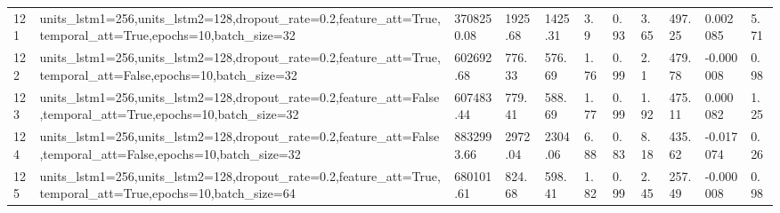\begin{longtable}{C{0.8cm} L{2cm} C{1.15cm} C{1.15cm} C{1.15cm} C{1.15cm} C{0.85cm} C{1.25cm} C{1.2cm} C{1.5cm} C{1.0cm}}
121 & units\_lstm1=256,\newline units\_lstm2=128,\newline dropout\_rate=0.2,\newline feature\_att=True,\newline temporal\_att=True,\newline epochs=10,\newline batch\_size=32 & 3708250.08 & 1925.68 & 1425.31 & 3.9 & 0.93 & 3.65 & 497.25 & 0.002085 & 5.71 \\
122 & units\_lstm1=256,\newline units\_lstm2=128,\newline dropout\_rate=0.2,\newline feature\_att=True,\newline temporal\_att=False,\newline epochs=10,\newline batch\_size=32 & 602692.68 & 776.33 & 576.69 & 1.76 & 0.99 & 2.1 & 479.78 & -0.000008 & 0.98 \\
123 & units\_lstm1=256,\newline units\_lstm2=128,\newline dropout\_rate=0.2,\newline feature\_att=False,\newline temporal\_att=True,\newline epochs=10,\newline batch\_size=32 & 607483.44 & 779.41 & 588.69 & 1.77 & 0.99 & 1.92 & 475.11 & 0.000082 & 1.25 \\
124 & units\_lstm1=256,\newline units\_lstm2=128,\newline dropout\_rate=0.2,\newline feature\_att=False,\newline temporal\_att=False,\newline epochs=10,\newline batch\_size=32 & 8832993.66 & 2972.04 & 2304.06 & 6.88 & 0.83 & 8.18 & 435.62 & -0.017074 & 0.26 \\
125 & units\_lstm1=256,\newline units\_lstm2=128,\newline dropout\_rate=0.2,\newline feature\_att=True,\newline temporal\_att=True,\newline epochs=10,\newline batch\_size=64 & 680101.61 & 824.68 & 598.41 & 1.82 & 0.99 & 2.45 & 257.49 & -0.000008 & 0.98 \\

\end{longtable}
